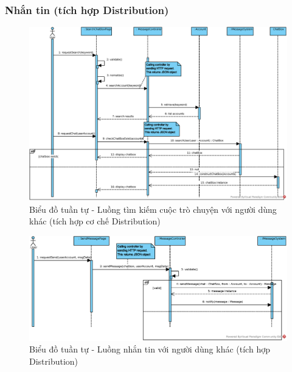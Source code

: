 \documentclass[./../main.tex]{subfiles}
\begin{document}
\subsubsection{Nhắn tin (tích hợp Distribution)}
\begin{figure}[H]
    \centering
    \includegraphics[width=\linewidth]{./images/UseCaseDesignDiagram/ucr_dis_searchChatBox.eps}
    \caption{Biểu đồ tuần tự - Luồng tìm kiếm cuộc trò chuyện với người dùng khác (tích hợp cơ chế Distribution)}
\end{figure}
\begin{figure}[H]
    \centering
    \includegraphics[width=\linewidth]{./images/UseCaseDesignDiagram/ucr_dis_message.eps}
    \caption{Biểu đồ tuần tự - Luồng nhắn tin với người dùng khác (tích hợp Distribution)}
\end{figure}
\end{document}
